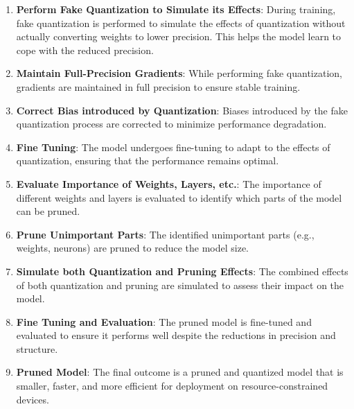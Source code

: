 \documentclass{ioereport}
\begin{document}
\begin{enumerate}[label=\textbf{\roman*.}]
        \item \textbf{Perform Fake Quantization to Simulate its Effects}: During training, fake quantization is performed to simulate the effects of quantization without actually converting weights to lower precision. This helps the model learn to cope with the reduced precision.
        
        \item \textbf{Maintain Full-Precision Gradients}: While performing fake quantization, gradients are maintained in full precision to ensure stable training.
        
        \item \textbf{Correct Bias introduced by Quantization}: Biases introduced by the fake quantization process are corrected to minimize performance degradation.
        
        \item \textbf{Fine Tuning}: The model undergoes fine-tuning to adapt to the effects of quantization, ensuring that the performance remains optimal.

        \item \textbf{Evaluate Importance of Weights, Layers, etc.}: The importance of different weights and layers is evaluated to identify which parts of the model can be pruned.
        
        \item \textbf{Prune Unimportant Parts}: The identified unimportant parts (e.g., weights, neurons) are pruned to reduce the model size.
        
        \item \textbf{Simulate both Quantization and Pruning Effects}: The combined effects of both quantization and pruning are simulated to assess their impact on the model.
        
        \item \textbf{Fine Tuning and Evaluation}: The pruned model is fine-tuned and evaluated to ensure it performs well despite the reductions in precision and structure.

        \item \textbf{Pruned Model}: The final outcome is a pruned and quantized model that is smaller, faster, and more efficient for deployment on resource-constrained devices.
    \end{enumerate}
\end{document}

